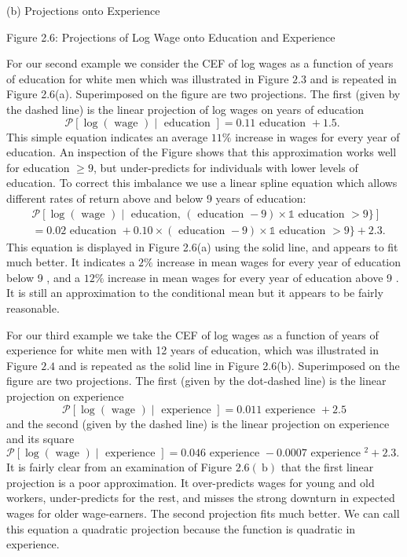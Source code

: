 \documentclass[10pt]{article}
\begin{document}
(b) Projections onto Experience

Figure 2.6: Projections of Log Wage onto Education and Experience

For our second example we consider the CEF of log wages as a function of years of education for white men which was illustrated in Figure $2.3$ and is repeated in Figure 2.6(a). Superimposed on the figure are two projections. The first (given by the dashed line) is the linear projection of log wages on years of education
$$
\mathscr{P}[\log (\text { wage }) \mid \text { education }]=0.11 \text { education }+1.5 \text {. }
$$
This simple equation indicates an average $11 \%$ increase in wages for every year of education. An inspection of the Figure shows that this approximation works well for education $\geq 9$, but under-predicts for individuals with lower levels of education. To correct this imbalance we use a linear spline equation which allows different rates of return above and below 9 years of education:
$$
\begin{aligned}
&\mathscr{P}[\log (\text { wage }) \mid \text { education, }(\text { education }-9) \times \mathbb{1} \text { education }>9\}] \\
&=0.02 \text { education }+0.10 \times(\text { education }-9) \times \mathbb{1} \text { education }>9\}+2.3 .
\end{aligned}
$$
This equation is displayed in Figure 2.6(a) using the solid line, and appears to fit much better. It indicates a $2 \%$ increase in mean wages for every year of education below 9 , and a $12 \%$ increase in mean wages for every year of education above 9 . It is still an approximation to the conditional mean but it appears to be fairly reasonable.

For our third example we take the CEF of log wages as a function of years of experience for white men with 12 years of education, which was illustrated in Figure $2.4$ and is repeated as the solid line in Figure 2.6(b). Superimposed on the figure are two projections. The first (given by the dot-dashed line) is the linear projection on experience
$$
\mathscr{P}[\log (\text { wage }) \mid \text { experience }]=0.011 \text { experience }+2.5
$$
and the second (given by the dashed line) is the linear projection on experience and its square
$$
\mathscr{P}[\log (\text { wage }) \mid \text { experience }]=0.046 \text { experience }-0.0007 \text { experience }^{2}+2.3 \text {. }
$$
It is fairly clear from an examination of Figure $2.6(\mathrm{~b})$ that the first linear projection is a poor approximation. It over-predicts wages for young and old workers, under-predicts for the rest, and misses the strong downturn in expected wages for older wage-earners. The second projection fits much better. We can call this equation a quadratic projection because the function is quadratic in experience.
\end{document}
